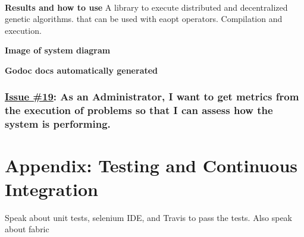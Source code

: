 \paragraph*{}
\textbf{Results and how to use}
A library to execute distributed and decentralized genetic algorithms. that can be used with eaopt operators.
Compilation and execution.

\textbf{Image of system diagram}

\textbf{Godoc docs automatically generated}


\subsubsection*{\href{https://github.com/salvacorts/TFG-Parasitic-Metaheuristics/issues/19}{Issue \#19}: As an Administrator, I want to get metrics from the execution of problems so that I can assess how the system is performing.}



\section{Appendix: Testing and Continuous Integration}

Speak about unit tests, selenium IDE, and Travis to pass the tests. Also speak about fabric
